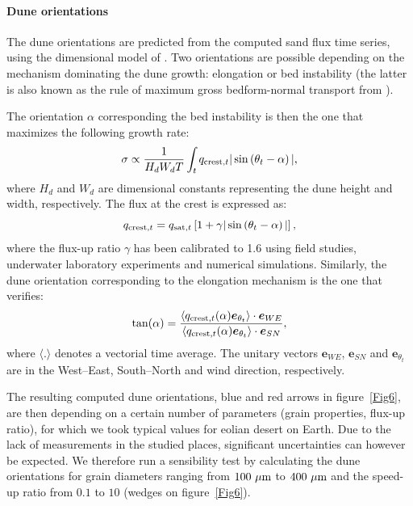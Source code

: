 \paragraph{Dune orientations}

The dune orientations are predicted from the computed sand flux time series, using the dimensional model of \citet{Courrech2014}. Two orientations are possible depending on the mechanism dominating the dune growth: elongation or bed instability (the latter is also known as the rule of maximum gross bedform-normal transport from \citet{Rubin1987}).

The orientation $\alpha$ corresponding the bed instability is then the one that maximizes the following growth rate:
\begin{equation}
  \sigma \propto \frac{1}{H_{d} W_{d} T}\int_{t}  q_{\textup{crest}, t}\vert \sin\left(\theta_{t} - \alpha\right) \vert,
\end{equation}
where $H_{d}$ and $W_{d}$ are dimensional constants representing the dune height and width, respectively. The flux at the crest is expressed as:
\begin{equation}
  q_{\textup{crest}, t} = q_{\textup{sat}, t}\left[1 + \gamma\vert\sin\left(\theta_{t} - \alpha\right)\vert\right],
\end{equation}
where the flux-up ratio $\gamma$ has been calibrated to 1.6 using field studies, underwater laboratory experiments and numerical simulations. Similarly, the dune orientation corresponding to the elongation mechanism is the one that verifies:
\begin{equation}
  \tan(\alpha) = \frac{\langle q_{\textup{crest}, t}(\alpha) \boldsymbol{e}_{\theta_{t}}\rangle \cdot \boldsymbol{e}_{WE} }{ \langle q_{\textup{crest}, t}(\alpha) \boldsymbol{e}_{\theta_{t}} \rangle \cdot \boldsymbol{e}_{SN}},
\end{equation}
where $\langle.\rangle$ denotes a vectorial time average. The unitary vectors $\boldsymbol{e}_{WE}$, $\boldsymbol{e}_{SN}$ and $\boldsymbol{e}_{\theta_{t}}$ are in the West--East, South--North and wind direction, respectively.

The resulting computed dune orientations, blue and red arrows in figure~\ref{Fig6}, are then depending on a certain number of parameters (grain properties, flux-up ratio), for which we took typical values for eolian desert on Earth. Due to the lack of measurements in the studied places, significant uncertainties can however be expected. We therefore run a sensibility test by calculating the dune orientations for grain diameters ranging from $100~\mu\textup{m}$ to $400~\mu\textup{m}$ and the speed-up ratio from $0.1$ to $10$ (wedges on figure~\ref{Fig6}).

